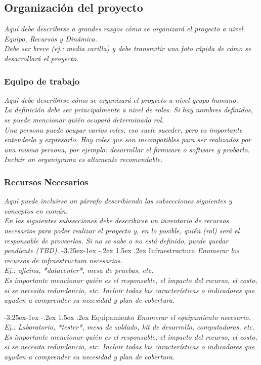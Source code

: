 \documentclass[12pt]{article}
\makeatletter
\renewcommand\paragraph{\@startsection{paragraph}{4}{\z@}%
                                     {-3.25ex\@plus -1ex \@minus -.2ex}%
                                     {1.5ex \@plus .2ex}%
                                     {\normalfont\normalsize\bfseries}}
\makeatother
\begin{document}
\subsection{Organización del proyecto}
{\it
Aquí debe describirse a grandes rasgos cómo se organizará el proyecto a nivel Equipo, Recursos y Dinámica.\\
Debe ser breve (ej.: media carilla) y debe transmitir una foto rápida de cómo se desarrollará el proyecto.
}
\subsubsection{Equipo de trabajo}
{\it
Aquí debe describirse cómo se organizará el proyecto a nivel grupo humano.\\
La definición debe ser principalmente a nivel de roles. Si hay nombres definidos, se puede mencionar quién ocupará determinado rol.\\
Una persona puede ocupar varios roles, eso suele suceder, pero es importante entenderlo y expresarlo. Hay roles que son incompatibles para ser realizados por una misma persona, por ejemplo: desarrollar el firmware o software y probarlo.\\
Incluir un organigrama es altamente recomendable.
}
\subsubsection{Recursos Necesarios}
{\it
Aquí puede incluirse un párrafo describiendo las subsecciones siguientes y conceptos en común.\\
En las siguientes subsecciones debe describirse un inventario de recursos necesarios para poder realizar el proyecto y, en lo posible, quién (rol) será el responsable de proveerlos. Si no se sabe o no está definido, puede quedar pendiente (TBD).
}
    \paragraph{Infraestructura}
    {\it
    Enumerar los recursos de infraestructura necesarios.\\
    Ej.: oficina, *datacenter*, mesa de pruebas, etc.\\
    Es importante mencionar quién es el responsable, el impacto del recurso, el costo, si se necesita redundancia, etc. Incluir todas las características o indicadores que ayuden a comprender su necesidad y plan de cobertura.
    }

    \paragraph{Equipamiento}
    {\it
    Enumerar el equipamiento necesario.\\
    Ej.: Laboratorio, *tester*, mesa de soldado, kit de desarrollo, computadoras, etc.\\
    Es importante mencionar quién es el responsable, el impacto del recurso, el costo, si se necesita redundancia, etc. Incluir todas las características o indicadores que ayuden a comprender su necesidad y plan de cobertura.
    }
\end{document}
